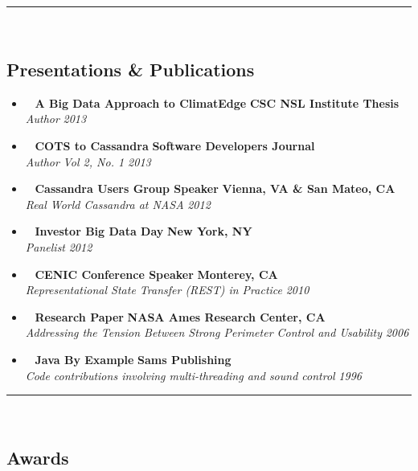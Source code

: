 \hrule\
\vspace{-0.4em}
\subsection*{Presentations \& Publications}

\begin{itemize}
    \parskip=0.1em
    \item\ 
    \headerrow
        {\textbf{A Big Data Approach to ClimatEdge\texttrademark}}
        {\textbf{CSC NSL Institute Thesis}}
    \\
    \headerrow
        {\emph{Author}}
        {\emph{2013}}
    \item\ 
	\headerrow
		{\textbf{COTS to Cassandra}}
		{\textbf{Software Developers Journal}}
	\\
	\headerrow
		{\emph{Author}}
		{\emph{Vol 2, No. 1 2013}}
    \item\ 
	\headerrow
		{\textbf{Cassandra Users Group Speaker}}
		{\textbf{Vienna, VA \& San Mateo, CA}}
	\\
	\headerrow
		{\emph{Real World Cassandra at NASA}}
		{\emph{2012}}
	\item\
	\headerrow
		{\textbf{Investor Big Data Day}}
		{\textbf{New York, NY}}
	\\
	\headerrow
		{\emph{Panelist}}
		{\emph{2012}} 
	\item\
    \headerrow
		{\textbf{CENIC Conference Speaker}}
		{\textbf{Monterey, CA}}
	\\
	\headerrow
		{\emph{Representational State Transfer (REST) in Practice}}
		{\emph{2010}}
	\item\ 
	\headerrow
		{\textbf{Research Paper}}
		{\textbf{NASA Ames Research Center, CA}}
	\\
	\headerrow
		{\emph{Addressing the Tension Between Strong Perimeter Control and Usability}}
		{\emph{2006}}
	\item\ 
	\headerrow
		{\textbf{Java By Example}}
		{\textbf{Sams Publishing}}
	\\
	\headerrow
		{\emph{Code contributions involving multi-threading and sound control}}
		{\emph{1996}}
\end{itemize}


\hrule\
\vspace{-0.4em}
\subsection*{Awards}

